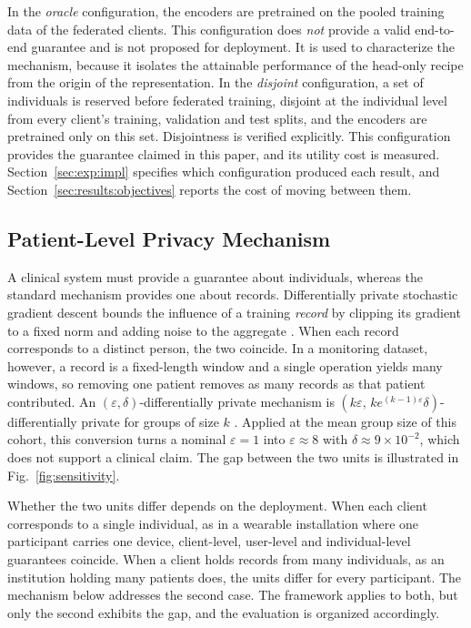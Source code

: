 In the \emph{oracle} configuration, the encoders are pretrained on the pooled
training data of the federated clients. This configuration does \emph{not}
provide a valid end-to-end guarantee and is not proposed for deployment. It is
used to characterize the mechanism, because it isolates the attainable
performance of the head-only recipe from the origin of the representation. In
the \emph{disjoint} configuration, a set of individuals is reserved before
federated training, disjoint at the individual level from every client's
training, validation and test splits, and the encoders are pretrained only on
this set. Disjointness is verified explicitly. This configuration provides the
guarantee claimed in this paper, and its utility cost is measured.
Section~\ref{sec:exp:impl} specifies which configuration produced each result,
and Section~\ref{sec:results:objectives} reports the cost of moving between
them.

\subsection{Patient-Level Privacy Mechanism}
\label{sec:method:threat}
\label{sec:method:privacy}

A clinical system must provide a guarantee about individuals, whereas the
standard mechanism provides one about records. Differentially private
stochastic gradient descent bounds the influence of a training \emph{record}
by clipping its gradient to a fixed norm and adding noise to the aggregate
\cite{ref6}. When each record corresponds to a distinct person, the two
coincide. In a monitoring dataset, however, a record is a fixed-length window
and a single operation yields many windows, so removing one patient removes as
many records as that patient contributed. An $(\varepsilon,\delta)$-differentially
private mechanism is $(k\varepsilon,\,k e^{(k-1)\varepsilon}\delta)$-differentially
private for groups of size $k$ \cite{ref8}. Applied at the mean group size of
this cohort, this conversion turns a nominal $\varepsilon = 1$ into
$\varepsilon \approx 8$ with $\delta \approx 9 \times 10^{-2}$, which does not
support a clinical claim. The gap between the two units is illustrated in
Fig.~\ref{fig:sensitivity}.

Whether the two units differ depends on the deployment. When each client
corresponds to a single individual, as in a wearable installation where one
participant carries one device, client-level, user-level and individual-level
guarantees coincide. When a client holds records from many individuals, as an
institution holding many patients does, the units differ for every
participant. The mechanism below addresses the second case. The framework
applies to both, but only the second exhibits the gap, and the evaluation is
organized accordingly.

